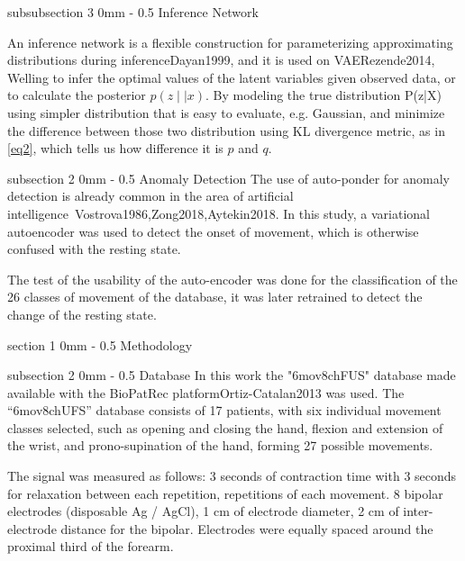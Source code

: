 \documentclass[a4paper, 12pt]{ppgeb}
\makeatletter
\renewcommand{\section}{\@startsection
{section}
{1}
{0mm}
{-\baselineskip}
{0.5\baselineskip}
{\large\bfseries\scshape}}
\renewcommand{\subsection}{\@startsection
{subsection}
{2}
{0mm}
{-\baselineskip}
{0.5\baselineskip}
{\bf\sffamily}}
\renewcommand{\subsubsection}{\@startsection
{subsubsection}
{3}
{0mm}
{-\baselineskip}
{0.5\baselineskip}
{\bf\sffamily}}
\makeatother
\begin{document}
\subsubsection{Inference Network}

An inference network is a flexible construction for parameterizing approximating distributions during inference\cite{mainreferences}{Dayan1999}, and it is used on VAE\cite{mainreferences}{Rezende2014, Welling} to infer the optimal values of the latent variables given observed data, or to calculate the posterior \(p(z∣|x)\). By modeling the true
distribution P(z|X) using simpler distribution that is easy to evaluate, e.g. Gaussian, and minimize the
difference between those two distribution using KL divergence metric, as in \ref{eq2}, which tells us how difference it is \(p\) and \(q\).

\subsection{Anomaly Detection}
The use of auto-ponder for anomaly detection is already common in the area of artificial intelligence~\cite{mainreferences}{Vostrova1986,Zong2018,Aytekin2018}. In this study, a variational autoencoder was used to detect the onset of movement, which is otherwise confused with the resting state.

The test of the usability of the auto-encoder was done for the classification of the 26 classes of movement of the database, it was later retrained to detect the change of the resting state.

\section{Methodology}

\subsection{Database}
In this work the "6mov8chFUS" database made available with the BioPatRec platform\cite{mainreferences}{Ortiz-Catalan2013} was used. The “6mov8chUFS” database consists of 17 patients, with six individual movement classes selected, such as opening and closing the hand, flexion and extension of the wrist, and prono-supination of the hand, forming 27 possible movements.

The signal was measured as follows: 3 seconds of contraction time with 3 seconds for relaxation between each repetition, repetitions of each movement. 8 bipolar electrodes (disposable Ag / AgCl), 1 cm of electrode diameter, 2 cm of inter-electrode distance for the bipolar. Electrodes were equally spaced around the proximal third of the forearm.
\end{document}
